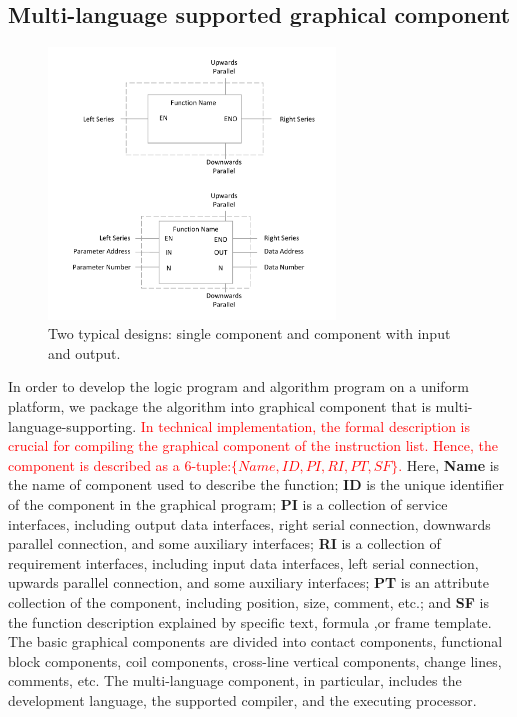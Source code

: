 \documentclass[journal,UTF8]{IEEEtran}
\begin{document}
	\subsection{Multi-language supported graphical component}
	\label{component}
	\begin{figure}
		\centering
		\includegraphics[width=3in]{fig/FIG6.pdf}
		\caption{ Two typical designs: single component and component with input and output.}
		\label{fig:Component}
	\end{figure}
	In order to develop the logic program and algorithm program on a uniform platform, we package the algorithm into graphical component that is multi-language-supporting. \textcolor{red}{ In technical implementation, the formal description is crucial for compiling the graphical component of the instruction list. Hence, the component is described as a 6-tuple:$\{Name,ID,PI,RI,PT,SF\}$.} Here, \textbf{Name} is the name of component used to describe the function;  \textbf{ID} is the unique identifier of the component in the graphical program; \textbf{PI} is a collection of service interfaces, including output data interfaces, right serial connection, downwards parallel connection, and some auxiliary interfaces; \textbf{RI} is a collection of requirement interfaces, including input data interfaces, left serial connection, upwards parallel connection, and some auxiliary interfaces;  \textbf{PT} is an attribute collection of the component, including position, size, comment, etc.; and \textbf{SF} is the function description explained by specific text, formula ,or frame template. The basic graphical components are divided into contact components, functional block components, coil components, cross-line vertical components, change lines, comments, etc. The multi-language component, in particular, includes the development language, the supported compiler, and the executing processor.
	
\end{document}

